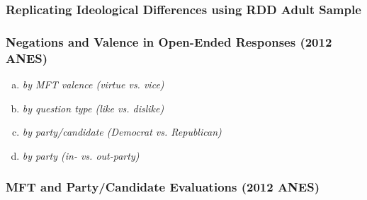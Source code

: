 \vspace{2em}
\subsubsection*{Replicating Ideological Differences using RDD Adult Sample}


\clearpage
\subsubsection*{Negations and Valence in Open-Ended Responses (2012 ANES)}
\vspace{2em}
\begin{enumerate}[a)]
\item \textit{by MFT valence (virtue vs. vice)}


\clearpage
\item \textit{by question type (like vs. dislike)}


\clearpage
\item \textit{by party/candidate (Democrat vs. Republican)}


\clearpage
\item \textit{by party (in- vs. out-party)}


\end{enumerate}

\clearpage
\subsubsection*{MFT and Party/Candidate Evaluations (2012 ANES)}
